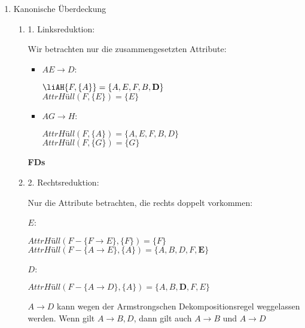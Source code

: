 \documentclass{lehramt-informatik-aufgabe}
\begin{document}
\begin{liAntwort}

\begin{enumerate}

\item Kanonische Überdeckung

\begin{enumerate}

%

\item 1. Linksreduktion:

Wir betrachten nur die zusammengesetzten Attribute:

\begin{itemize}
\item $AE \rightarrow D$:

$\liAH{F, \{A\}} = \{A, E, F, B, \textbf{D}\}$ \\
$\textit{AttrHüll}(F, \{E\}) = \{E\}$

\item $AG \rightarrow H$:

$\textit{AttrHüll}(F, \{A\}) = \{A, E, F, B, D\}$ \\
$\textit{AttrHüll}(F, \{G\}) = \{G\}$
\end{itemize}

\textbf{FDs}


%

\item 2. Rechtsreduktion:

Nur die Attribute betrachten, die rechts doppelt vorkommen:

$E$:

$\textit{AttrHüll}(F - \{F \rightarrow E\}, \{F\}) = \{F\}$ \\
$\textit{AttrHüll}(F - \{A \rightarrow E\}, \{A\}) = \{A, B, D, F, \textbf{E}\}$

$D$:

$\textit{AttrHüll}(F - \{A \rightarrow D\}, \{A\}) = \{A, B, \textbf{D}, F, E\}$

$A \rightarrow D$ kann wegen der Armstrongschen Dekompositionsregel
weggelassen werden. Wenn gilt $A \rightarrow B, D$, dann gilt auch $A
\rightarrow B$ und $A \rightarrow D$


\end{enumerate}
\end{enumerate}
\end{liAntwort}
\end{document}
